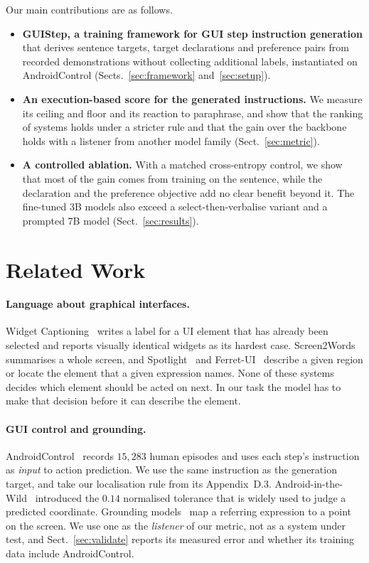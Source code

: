 \documentclass[runningheads,a4paper]{llncs}
\begin{document}
Our main contributions are as follows.
\begin{itemize}
\item \textbf{GUIStep, a training framework for GUI step instruction generation} that derives
sentence targets, target declarations and preference pairs from recorded demonstrations without
collecting additional labels, instantiated on AndroidControl (Sects.~\ref{sec:framework}
and~\ref{sec:setup}).
\item \textbf{An execution-based score for the generated instructions.} We measure its ceiling and floor and its reaction to paraphrase, and show that the ranking of systems holds under a stricter rule and that the gain over the backbone holds with a listener from another model family (Sect.~\ref{sec:metric}).
\item \textbf{A controlled ablation.} With a matched cross-entropy control, we show that most of the gain comes from training on the sentence, while the declaration and the preference objective add no clear benefit beyond it. The fine-tuned 3B models also exceed a select-then-verbalise variant and a prompted 7B model (Sect.~\ref{sec:results}).
\end{itemize}

\section{Related Work}
\label{sec:related}

\paragraph{Language about graphical interfaces.}
Widget Captioning~\cite{widgetcap} writes a label for a UI element that has already been selected
and reports visually identical widgets as its hardest case. Screen2Words~\cite{screen2words}
summarises a whole screen, and Spotlight~\cite{spotlight} and Ferret-UI~\cite{ferretui} describe a given region or locate the element that a given expression names. None of these systems decides which element should be acted on next. In our task the model has to make that decision before it can describe the element.

\paragraph{GUI control and grounding.}
AndroidControl~\cite{androidcontrol} records $15{,}283$ human episodes and uses each step's
instruction as \emph{input} to action prediction. We use the same instruction as the generation
target, and take our localisation rule from its Appendix~D.3. Android-in-the-Wild~\cite{aitw}
introduced the $0.14$ normalised tolerance that is widely used to judge a predicted coordinate.
Grounding
models~\cite{seeclick,osatlas,uground} map a referring expression to a point on the screen. We use
one as the \emph{listener} of our metric, not as a system under test, and Sect.~\ref{sec:validate}
reports its measured error and whether its training data include AndroidControl.
\end{document}
